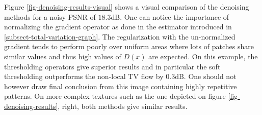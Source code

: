 \documentclass[final]{siamltex}
\begin{document}
Figure \ref{fig-denoising-results-visual} shows a visual comparison of the denoising methods for a noisy PSNR of $18.3$dB. One can notice the importance of normalizing the gradient operator as done in the estimator introduced in \ref{subsect-total-variation-graph}. The regularization with the un-normalized gradient tends to perform poorly over uniform areas where lots of patches share similar values and thus high values of $D(x)$ are expected. On this example, the thresholding operators give superior results and in particular the soft thresholding outperforms the non-local TV flow by 0.3dB. One should not however draw final conclusion from this image containing highly repetitive patterns. On more complex textures such as the one depicted on figure \ref{fig-denoising-results}, right, both methods give similar results.
\end{document}
